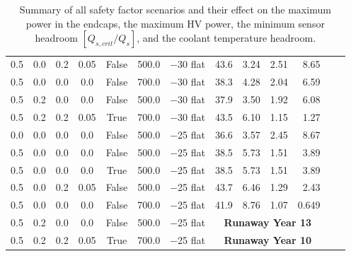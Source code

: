 \begin{table}[ht]
\begin{centering}
{\begin{tabular}{|ccccc|cc|rrrr|r|r|}
0.5     &     0.0 &   0.2 &  0.05 & False & 500.0 &  $-$30 flat &      43.6 &    3.24 &      2.51 &       8.65 \\ 
0.5     &     0.0 &   0.0 &   0.0 & False & 700.0 &  $-$30 flat &      38.3 &    4.28 &      2.04 &       6.59 \\ 
0.5     &     0.2 &   0.0 &   0.0 & False & 500.0 &  $-$30 flat &      37.9 &    3.50 &      1.92 &       6.08 \\ 
0.5     &     0.2 &   0.2 &  0.05 &  True & 700.0 &  $-$30 flat &      43.5 &    6.10 &      1.15 &       1.27 \\ \hline
0.0     &     0.0 &   0.0 &   0.0 & False & 500.0 &  $-$25 flat &      36.6 &    3.57 &      2.45 &       8.67 \\ 
0.5     &     0.0 &   0.0 &   0.0 & False & 500.0 &  $-$25 flat &      38.5 &    5.73 &      1.51 &       3.89 \\ 
0.5     &     0.0 &   0.0 &   0.0 &  True & 500.0 &  $-$25 flat &      38.5 &    5.73 &      1.51 &       3.89 \\ 
0.5     &     0.0 &   0.2 &  0.05 & False & 500.0 &  $-$25 flat &      43.7 &    6.46 &      1.29 &       2.43 \\ 
0.5     &     0.0 &   0.0 &   0.0 & False & 700.0 &  $-$25 flat &      41.9 &    8.76 &      1.07 &      0.649 \\ 
0.5     &     0.2 &   0.0 &   0.0 & False & 500.0 &  $-$25 flat & \multicolumn{4}{c|}{\bf Runaway Year 13} \\
0.5     &     0.2 &   0.2 &  0.05 &  True & 700.0 &  $-$25 flat & \multicolumn{4}{c|}{\bf Runaway Year 10} \\
\hline\end{tabular}
} %
\caption{Summary of all safety factor scenarios and their effect on the maximum power in the
endcaps, the maximum HV power, the minimum sensor headroom $[Q_{s,crit}/Q_s]$, and the coolant temperature headroom.}
\label{detailed_safety_table}
\end{centering}
\end{table}



